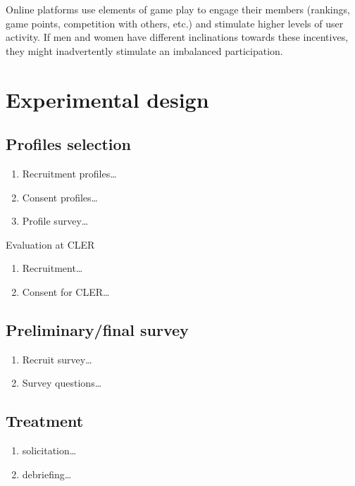 \documentclass[12pt, titlepage]{article}
\providecommand{\tightlist}{%
  \setlength{\itemsep}{0pt}\setlength{\parskip}{0pt}}
\begin{document}
Online platforms use elements of game play to engage their members
(rankings, game points, competition with others, etc.) and stimulate
higher levels of user activity. If men and women have different
inclinations towards these incentives, they might inadvertently
stimulate an imbalanced participation.

\section{Experimental design}\label{experimental-design}

\subsection{Profiles selection}\label{profiles-selection}

\begin{enumerate}
\def\labelenumi{\arabic{enumi}.}
\tightlist
\item
  Recruitment profiles\ldots{}
\item
  Consent profiles\ldots{}
\item
  Profile survey\ldots{}
\end{enumerate}

Evaluation at CLER

\begin{enumerate}
\def\labelenumi{\arabic{enumi}.}
\tightlist
\item
  Recruitment\ldots{}
\item
  Consent for CLER\ldots{}
\end{enumerate}

\subsection{Preliminary/final survey}\label{preliminaryfinal-survey}

\begin{enumerate}
\def\labelenumi{\arabic{enumi}.}
\tightlist
\item
  Recruit survey\ldots{}
\item
  Survey questions\ldots{}
\end{enumerate}

\subsection{Treatment}\label{treatment}

\begin{enumerate}
\def\labelenumi{\arabic{enumi}.}
\tightlist
\item
  solicitation\ldots{}
\item
  debriefing\ldots{}
\end{enumerate}
\end{document}
